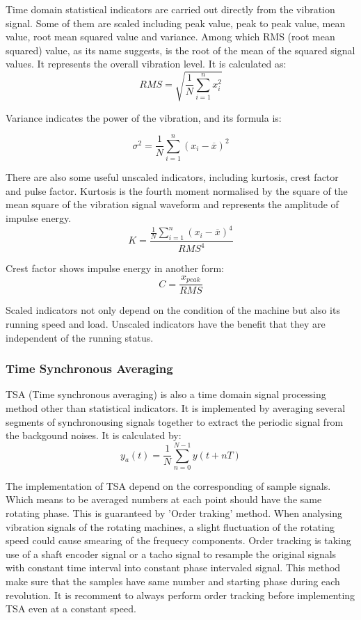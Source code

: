 Time domain statistical indicators are carried out directly from the vibration signal. Some of them are scaled including peak value, peak to peak value, mean value, root mean squared value and variance.
Among which RMS (root mean squared) value, as its name suggests, is the root of the mean of the squared signal values. It represents the overall vibration level. It is calculated as:
\begin{equation}
	RMS = \sqrt{\frac{1}{N}\sum_{i=1}^n x_{i}^2}
\end{equation}

Variance indicates the power of the vibration, and its formula is:

\begin{equation}
	\sigma^2 = \frac{1}{N}\sum_{i=1}^n (x_{i} - \overline{x})^2
\end{equation}

There are also some useful unscaled indicators, including kurtosis, crest factor and pulse factor. Kurtosis is the fourth moment normalised by the square of the mean square of the vibration signal waveform and represents the amplitude of impulse energy. \cite{trending} 
\begin{equation}
	K = \frac{\frac{1}{N}\sum_{i=1}^n (x_{i} - \overline{x})^4}{RMS^4}
\end{equation}

Crest factor shows impulse energy in another form:
\begin{equation}
	C = \frac{x_{peak}}{RMS}
\end{equation}

Scaled indicators not only depend on the condition of the machine but also its running speed and load. Unscaled indicators have the benefit that they are independent of the running status.

\subsubsection{Time Synchronous Averaging}

TSA (Time synchronous averaging) is also a time domain signal processing method other than statistical indicators. It is implemented by averaging several segments of synchronousing signals together to extract the periodic signal from the backgound noises. It is calculated by:
\begin{equation}
	y_{a}(t) = \frac{1}{N}\sum_{n=0}^{N-1} y(t+nT)
\end{equation}

The implementation of TSA depend on the corresponding of sample signals. Which means to be averaged numbers at each point should have the same rotating phase. This is guaranteed by 'Order traking' method. When analysing vibration signals of the rotating machines, a slight fluctuation of the rotating speed could cause smearing of the frequecy components. Order tracking is taking use of a shaft encoder signal or a tacho signal to resample the original signals with constant time interval into constant phase intervaled signal. This method make sure that the samples have same number and starting phase during each revolution. It is recomment to always perform order tracking before implementing TSA even at a constant speed.

